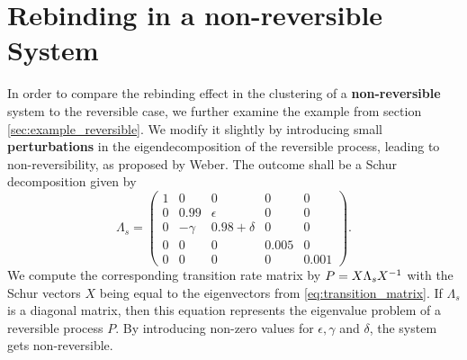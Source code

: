 \section{Rebinding in a non-reversible System}

In order to compare the rebinding effect in the clustering of a \textbf{non-reversible} system to the reversible case, we further examine the example from section \ref{sec:example_reversible}. We modify it slightly by introducing small \textbf{perturbations} in the eigendecomposition of the reversible process, leading to non-reversibility, as proposed by Weber\cite{Weber2017}.
The outcome shall be a Schur decomposition given by
\begin{equation}
\label{eq:schur_decomp}
\Lambda_s =
\begin{pmatrix}
1 & 0 & 0 & 0 & 0 \\
0 & 0.99 & \epsilon & 0 & 0 \\
0 & -\gamma & 0.98+\delta & 0 & 0 \\
0 & 0 & 0 & 0.005 & 0 \\
0 & 0 & 0 & 0 & 0.001
\end{pmatrix}.
\end{equation}
We compute the corresponding transition rate matrix by $P = X \Lambda_s X^{-1}$ with the Schur vectors $X$ being equal to the eigenvectors from \eqref{eq:transition_matrix}.
If $\Lambda_s$ is a diagonal matrix, then this equation represents the eigenvalue problem of a reversible process $P$. By introducing non-zero values for $\epsilon, \gamma$ and $\delta$, the system gets non-reversible.

